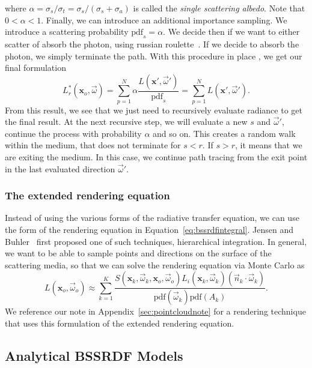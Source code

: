 where $\alpha = \sigma_s / \sigma_t = \sigma_s / (\sigma_s + \sigma_a)  $ is called the \emph{single scattering albedo}. Note that $0 < \alpha < 1$.  Finally, we can introduce an additional importance sampling. We introduce a scattering probability $\text{pdf}_s = \alpha$. We decide then if we want to either scatter of absorb the photon, using russian roulette~\cite{Arvo1990}. If we decide to absorb the photon, we simply terminate the path. With this procedure in place , we get our final formulation
\begin{equation*}
L_r^*(\mathbf{x}_o, \vec{\omega}) = \sum_{p=1}^N \alpha \frac{L(\mathbf{x}', \vec{\omega}')} {\text{pdf}_s} = \sum_{p=1}^N  L(\mathbf{x}', \vec{\omega}'). 
\end{equation*}
From this result, we see that we just need to recursively evaluate radiance to get the final result. At the next recursive step, we will evaluate a new $s$ and $\vec{\omega}'$, continue the process with probability $\alpha$ and so on. This creates a random walk within the medium, that does not terminate for $s < r$. If $s > r$, it means that we are exiting the medium. In this case, we continue path tracing from the exit point in the last evaluated direction $\vec{\omega}'$.

\subsubsection{The extended rendering equation}

Instead of using the various forms of the radiative transfer equation, we can use the form of the rendering equation in Equation~\ref{eq:bssrdfintegral}. Jensen and Buhler~\cite{Jensen2002} first proposed one of such techniques, hierarchical integration. In general, we want to be able to sample points and directions on the surface of the scattering media, so that we can solve the rendering equation via Monte Carlo as
\begin{equation*}
L(\mathbf{x}_o, \vec{\omega}_o) \approx \sum_{k = 1}^K \frac{S(\mathbf{x}_k, \vec{\omega}_k, \mathbf{x}_o, \vec{\omega}_o) L_i(\mathbf{x}_k, \vec{\omega}_k) (\vec{n}_k \cdot \vec{\omega}_k)}{\text{pdf}(\vec{\omega}_k) \text{pdf}(A_k)} .
\end{equation*}
We reference our note in Appendix~\ref{sec:pointcloudnote} for a rendering technique that uses this formulation of the extended rendering equation.

\subsection{Analytical BSSRDF Models}

